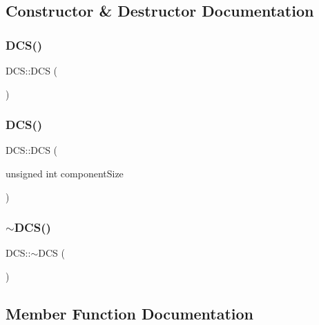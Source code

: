 \subsection{Constructor \& Destructor Documentation}
\mbox{\label{class_d_c_s_a9b4fbb5c80ef6b265669082703312cd6}} 
\subsubsection{\texorpdfstring{D\+C\+S()}{DCS()}\hspace{0.1cm}{\footnotesize\ttfamily [1/2]}}
{\footnotesize\ttfamily D\+C\+S\+::\+D\+CS (\begin{DoxyParamCaption}{ }\end{DoxyParamCaption})}

\mbox{\label{class_d_c_s_ad923153aa60c70d718c1be1b47e45a61}} 
\subsubsection{\texorpdfstring{D\+C\+S()}{DCS()}\hspace{0.1cm}{\footnotesize\ttfamily [2/2]}}
{\footnotesize\ttfamily D\+C\+S\+::\+D\+CS (\begin{DoxyParamCaption}\item[{unsigned int}]{component\+Size }\end{DoxyParamCaption})}

\mbox{\label{class_d_c_s_a7e6e0c1df0b016e246801b4347f3a208}} 
\subsubsection{\texorpdfstring{$\sim$\+D\+C\+S()}{~DCS()}}
{\footnotesize\ttfamily D\+C\+S\+::$\sim$\+D\+CS (\begin{DoxyParamCaption}{ }\end{DoxyParamCaption})\hspace{0.3cm}{\ttfamily [virtual]}}



\subsection{Member Function Documentation}
\mbox{\label{class_d_c_s_a3c4c817b466389070cb7d8051c2ec38f}} 
